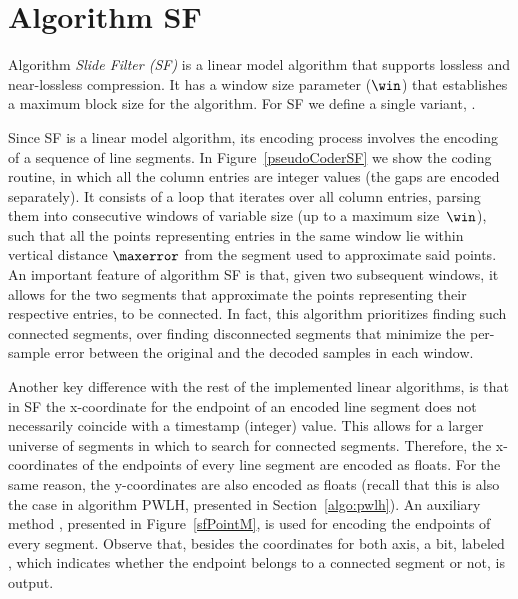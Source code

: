 

\section{Algorithm SF}
\label{algo:sf}

Algorithm \textit{Slide Filter (SF)} \cite{coder:sf} is a linear model algorithm that supports lossless and near-lossless compression. It has a window size parameter ($\win$) that establishes a maximum block size for the algorithm. For SF we define a single variant, \maskalgo.


Since SF is a linear model algorithm, its encoding process involves the encoding of a sequence of line segments. In Figure~\ref{pseudoCoderSF} we show the coding routine, in which all the column entries are integer values (the gaps are encoded separately). It consists of a loop that iterates over all column entries, parsing them into consecutive windows of variable size (up to a maximum size~$\win$), such that all the points representing entries in the same window lie within vertical distance $\maxerror$ from the segment used to approximate said points. An important feature of algorithm SF is that, given two subsequent windows, it allows for the two segments that approximate the points representing their respective entries, to be connected. In fact, this algorithm prioritizes finding such connected segments, 
over finding disconnected segments that minimize the per-sample error between the original and the decoded samples in each window. 





\clearpage


Another key difference with the rest of the implemented linear algorithms, is that in SF the x-coordinate for the endpoint of an encoded line segment does not necessarily coincide with a timestamp (integer) value. This allows for a larger universe of segments in which to search for connected segments. Therefore, the x-coordinates of the endpoints of every line segment are encoded as floats. For the same reason, the y-coordinates are also encoded as floats (recall that this is also the case in algorithm PWLH, presented in Section~\ref{algo:pwlh}). An auxiliary method \SFEncodePoint, presented in Figure~\ref{sfPointM}, is used for encoding the endpoints of every segment. Observe that, besides the coordinates for both axis, a bit, labeled \connectedS, which indicates whether the endpoint belongs to a connected segment or not, is output.


